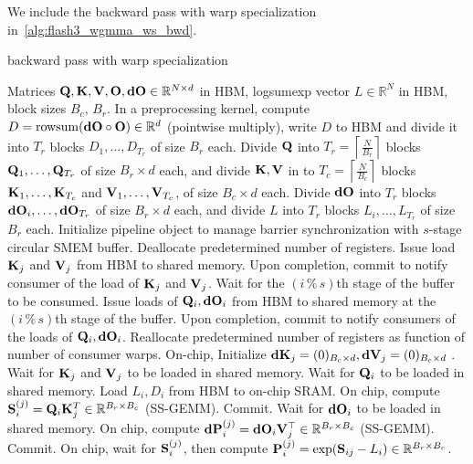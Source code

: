 We include the backward pass with warp specialization in~\cref{alg:flash3_wgmma_ws_bwd}.
\begin{algorithm}[H]
    \caption{\small\label{alg:flash3_wgmma_ws_bwd}\fat backward pass with warp specialization}
    \begin{algorithmic}[1]
\REQUIRE Matrices $\mathbf{Q}, \mathbf{K}, \mathbf{V}, \mathbf{O}, \mathbf{dO} \in \mathbb{R}^{N \times d}$ in HBM,
logsumexp vector $L \in \mathbb{R}^N$ in HBM, block sizes $B_c$, $B_r$.
\STATE In a preprocessing kernel, compute $D = \mathrm{rowsum}(\mathbf{dO} \circ \mathbf{O}) \in \mathbb{R}^d$ (pointwise multiply), write
$D$ to HBM and divide it into $T_r$ blocks $D_1, \dots, D_{T_r}$ of size
$B_r$ each.
\STATE Divide $\mathbf{Q}$ into $T_r = \left\lceil\frac{N}{B_r} \right\rceil$ blocks $\mathbf{Q}_1, \dots, \mathbf{Q}_{T_r}$ of size $B_r \times d$ each,
and divide $\mathbf{K}, \mathbf{V}$ in to $T_c = \left\lceil \frac{N}{B_c} \right\rceil$ blocks $\mathbf{K}_1, \dots, \mathbf{K}_{T_c}$ and
$\mathbf{V}_1, \dots, \mathbf{V}_{T_c}$, of size $B_c \times d$ each.
\STATE Divide $\mathbf{dO}$ into $T_r$ blocks $\mathbf{dO}_i, \dots, \mathbf{dO}_{T_r}$
of size $B_r \times d$ each, and divide $L$ into $T_r$ blocks $L_i, \dots, L_{T_r}$ of size
$B_r$ each.
\STATE Initialize pipeline object to manage barrier synchronization with $s$-stage circular SMEM buffer.
\STATE Deallocate predetermined number of registers.
\STATE Issue load $\mathbf{K}_j$ and $\mathbf{V}_j$ from HBM to shared memory.
\STATE Upon completion, commit to notify consumer of the load of $\mathbf{K}_j$ and $\mathbf{V}_j$.
    \STATE Wait for the $(i\,\%\,s)$th stage of the buffer to be consumed.
    \STATE Issue loads of $\mathbf{Q}_i, \mathbf{dO}_i$ from HBM to shared memory at the $(i\,\%\,s)$th stage of the buffer.
    \STATE Upon completion, commit to notify consumers of the loads of $\mathbf{Q}_i, \mathbf{dO}_i$.
\ENDFOR
{}
\STATE Reallocate predetermined number of registers as function of number of consumer warps.
\STATE On-chip, Initialize $\mathbf{dK}_j = (0)_{B_c \times d}, \mathbf{dV}_j = (0)_{B_c \times d}$ .
\STATE Wait for $\mathbf{K}_j$ and $\mathbf{V}_j$ to be loaded in shared memory.
\STATE Wait for $\mathbf{Q}_i$ to be loaded in shared memory.
\STATE Load $L_i, D_i$ from HBM to on-chip SRAM.
\STATE On chip, compute $\mathbf{S}_{i}^{(j)} = \mathbf{Q}_i \mathbf{K}_j^T \in \mathbb{R}^{B_r \times B_c}$
(SS-GEMM). Commit.
\STATE Wait for $\mathbf{dO}_i$ to be loaded in shared memory.
\STATE On chip, compute $\mathbf{dP}_{i}^{(j)} = \mathbf{dO}_{i} \mathbf{V}_j^\top \in \mathbb{R}^{B_r \times B_c}$
(SS-GEMM). Commit.
\STATE On chip, wait for $\mathbf{S}_{i}^{(j)}$, then compute $\mathbf{P}_{i}^{(j)} = \mathrm{exp}(\mathbf{S}_{ij} - L_{i}) \in \mathbb{R}^{B_r \times B_c}$.

\end{algorithmic}
\end{algorithm}
